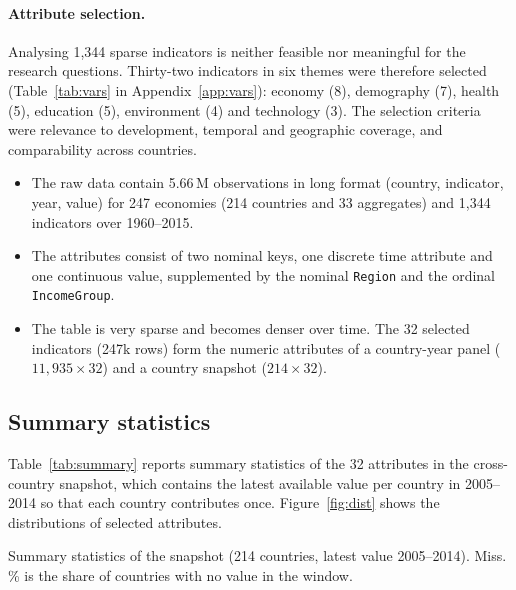 \documentclass[11pt,a4paper]{article}
\newcommand{\var}[1]{\texttt{#1}}
\newcommand{\tab}[1]{\begin{adjustbox}{max width=\textwidth}\end{adjustbox}}
\begin{document}
\paragraph{Attribute selection.} Analysing 1,344 sparse indicators is neither feasible nor meaningful for the research questions. Thirty-two indicators in six themes were therefore selected (Table~\ref{tab:vars} in Appendix~\ref{app:vars}): economy (8), demography (7), health (5), education (5), environment (4) and technology (3). The selection criteria were relevance to development, temporal and geographic coverage, and comparability across countries.

\begin{summary}
\begin{itemize}
\item The raw data contain 5.66\,M observations in long format (country, indicator, year, value) for 247 economies (214 countries and 33 aggregates) and 1,344 indicators over 1960--2015.
\item The attributes consist of two nominal keys, one discrete time attribute and one continuous value, supplemented by the nominal \var{Region} and the ordinal \var{IncomeGroup}.
\item The table is very sparse and becomes denser over time. The 32 selected indicators (247k rows) form the numeric attributes of a country-year panel ($11{,}935 \times 32$) and a country snapshot ($214 \times 32$).
\end{itemize}
\end{summary}

\subsection{Summary statistics}
Table~\ref{tab:summary} reports summary statistics of the 32 attributes in the cross-country snapshot, which contains the latest available value per country in 2005--2014 so that each country contributes once. Figure~\ref{fig:dist} shows the distributions of selected attributes.

\begin{table}[htbp]\centering
\caption{Summary statistics of the snapshot (214 countries, latest value 2005--2014). Miss.\,\% is the share of countries with no value in the window.}\label{tab:summary}
\tab{summary}
\end{table}
\end{document}
